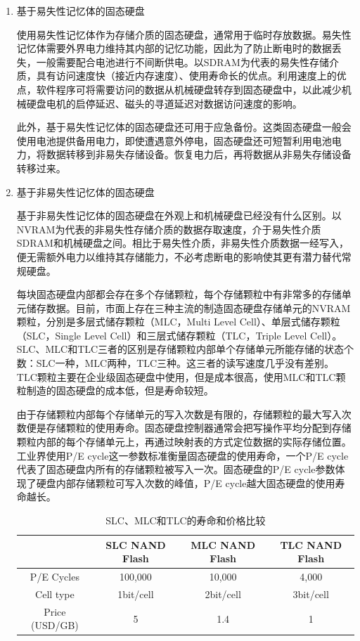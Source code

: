 \begin{enumerate}
\item 基于易失性记忆体的固态硬盘

使用易失性记忆体作为存储介质的固态硬盘，通常用于临时存放数据。易失性记忆体需要外界电力维持其内部的记忆功能，因此为了防止断电时的数据丢失，一般需要配合电池进行不间断供电。以SDRAM为代表的易失性存储介质，具有访问速度快（接近内存速度）、使用寿命长的优点。利用速度上的优点，软件程序可将需要访问的数据从机械硬盘转存到固态硬盘中，以此减少机械硬盘电机的启停延迟、磁头的寻道延迟对数据访问速度的影响。

此外，基于易失性记忆体的固态硬盘还可用于应急备份。这类固态硬盘一般会使用电池提供备用电力，即使遭遇意外停电，固态硬盘还可短暂利用电池电力，将数据转移到非易失存储设备。恢复电力后，再将数据从非易失存储设备转移过来。

\item 基于非易失性记忆体的固态硬盘

基于非易失性记忆体的固态硬盘在外观上和机械硬盘已经没有什么区别。以NVRAM为代表的非易失性存储介质的数据存取速度，介于易失性介质SDRAM和机械硬盘之间。相比于易失性介质，非易失性介质数据一经写入，便无需额外电力以维持其存储能力，不必考虑断电的影响使其更有潜力替代常规硬盘。

每块固态硬盘内部都会存在多个存储颗粒，每个存储颗粒中有非常多的存储单元储存数据。目前，市面上存在三种主流的制造固态硬盘存储单元的NVRAM颗粒，分別是多层式储存颗粒（MLC，Multi Level Cell）、单层式储存颗粒（SLC，Single Level Cell）和三层式储存颗粒（TLC，Triple Level Cell）。SLC、MLC和TLC三者的区别是存储颗粒内部单个存储单元所能存储的状态个数：SLC一种，MLC两种，TLC三种。这三者的读写速度几乎没有差别。TLC颗粒主要在企业级固态硬盘中使用，但是成本很高，使用MLC和TLC颗粒制造的固态硬盘的成本低，但是寿命较短。

由于存储颗粒内部每个存储单元的写入次数是有限的，存储颗粒的最大写入次数便是存储颗粒的使用寿命。固态硬盘控制器通常会把写操作平均分配到存储颗粒内部的每个存储单元上，再通过映射表的方式定位数据的实际存储位置。工业界使用P/E cycle这一参数标准衡量固态硬盘的使用寿命，一个P/E cycle代表了固态硬盘内所有的存储颗粒被写入一次。固态硬盘的P/E cycle参数体现了硬盘内部存储颗粒可写入次数的峰值，P/E cycle越大固态硬盘的使用寿命越长。

\begin{table}[htb]
\centering
\caption{SLC、MLC和TLC的寿命和价格比较}
\begin{tabular}{|c|c|c|c|}
\hline  & SLC NAND Flash & MLC NAND Flash & TLC NAND Flash \\
\hline P/E Cycles & 100,000 & 10,000 & 4,000 \\
\hline Cell type & 1bit/cell & 2bit/cell & 3bit/cell \\
\hline Price (USD/GB) & 5 & 1.4 & 1 \\
\hline
\end{tabular}
\label{tab:slc-mlc-tlc-compare}
\end{table}


\end{enumerate}
